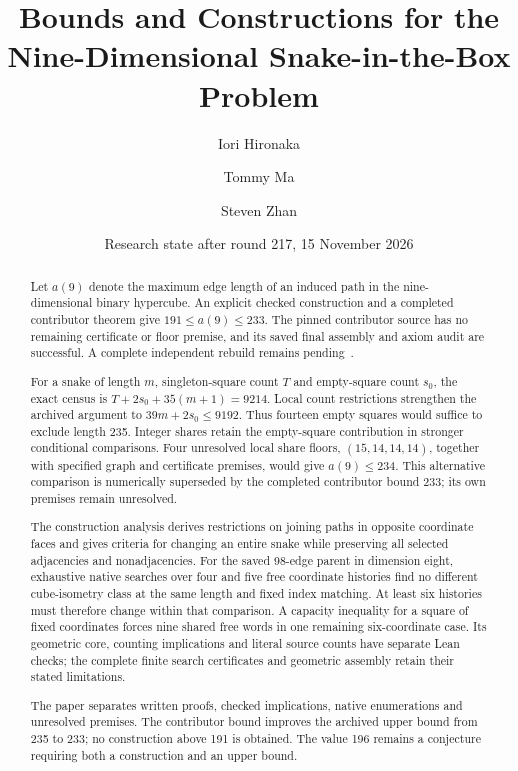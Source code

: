 \documentclass[11pt,a4paper]{article}
\title{Bounds and Constructions for the\\
Nine-Dimensional Snake-in-the-Box Problem}
\author{Iori Hironaka \and Tommy Ma \and Steven Zhan}
\date{Research state after round 217, 15 November 2026}
\theoremstyle{definition}
\theoremstyle{remark}
\begin{document}
\maketitle
\begin{abstract}
Let $a(9)$ denote the maximum edge length of an induced path in the
nine-dimensional binary hypercube. An explicit checked construction and
a completed contributor theorem give $191\le a(9)\le233$.
The pinned contributor source has no remaining certificate or floor
premise, and its saved final assembly and axiom audit are successful.
A complete independent rebuild remains pending~\cite{bound233archive}.

For a snake of length $m$, singleton-square count $T$ and empty-square
count $s_0$, the exact census is $T+2s_0+35(m+1)=9214$.
Local count restrictions strengthen the archived argument to
$39m+2s_0\le9192$. Thus fourteen empty squares would suffice to exclude
length 235. Integer shares retain the empty-square contribution in
stronger conditional comparisons. Four unresolved local share floors,
$(15,14,14,14)$, together with specified graph and certificate premises,
would give $a(9)\le234$. This alternative comparison is numerically
superseded by the completed contributor bound 233; its own premises
remain unresolved.

The construction analysis derives restrictions on joining paths in
opposite coordinate faces and gives criteria for changing an entire
snake while preserving all selected adjacencies and nonadjacencies.
For the saved 98-edge parent in dimension eight, exhaustive native
searches over four and five free coordinate histories find no different
cube-isometry class at the same length and fixed index matching.
At least six histories must therefore change within that comparison.
A capacity inequality for a square of fixed coordinates forces nine
shared free words in one remaining six-coordinate case. Its geometric
core, counting implications and literal source counts have separate
Lean checks; the complete finite search certificates and geometric
assembly retain their stated limitations.

The paper separates written proofs, checked implications, native
enumerations and unresolved premises. The contributor bound improves
the archived upper bound from 235 to 233; no construction above 191
is obtained. The value 196
remains a conjecture requiring both a construction and an upper bound.
\end{abstract}

\clearpage
\setcounter{tocdepth}{1}
\tableofcontents
\clearpage
\end{document}
